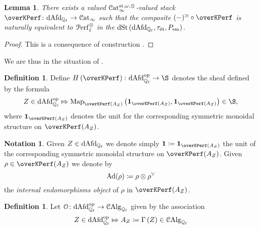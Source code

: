 \documentclass[10pt,a4paper]{amsart}
\numberwithin{equation}{subsection}
\theoremstyle{plain}
\newtheorem{lemma}[theorem]{Lemma}
\theoremstyle{definition}
\newtheorem{defi}[theorem]{Definition}
\newtheorem{notation}[theorem]{Notation}
\theoremstyle{remark}
\numberwithin{equation}{section}
\begin{document}
\begin{lemma} \label{lem:rigidity}
There exists a valued $\mathcal{C}\mathrm{at}_\infty^{\mathrm{st}, \omega, \otimes}$-valued stack $\overKPerf \colon \dAfdl \to \Cat$ such that the composite $(-)^{\simeq} \circ \overKPerf$ is naturally equivalent to $\mathcal{P} \mathrm{erf}^{\otimes}_{\ell}$ in the \infcat $\mathrm{dSt} \left( \mathrm{dAfd}_{\mathbb{Q}_\ell}, \tau_{\text{\'et}}, P_{\mathrm{sm}} \right)$.
\end{lemma}

\begin{proof}
This is a consequence of construction \cite{me1}.
\end{proof}

We are thus in the situation of \cite[$\textsection$ 3]{toen_ss}.

\begin{defi}
Define $H \left( \overKPerf \right) \colon \dAfdl^{\op} \to \S$ denotes the sheaf defined by the formula
	\[
		Z \in \dAfdl^{\op} \Mapsto \Map_{\overKPerf(A_Z)} \left(\mathbf 1_{\overKPerf(A_Z)}, \mathbf 1_{\overKPerf(A_Z)} \right) \in \S,
	\]
where $\mathbf 1_{\overKPerf(A_Z)}$ denotes the unit for the corresponding symmetric monoidal structure on $\overKPerf(A_Z)$.
\end{defi}

\begin{notation}
Given $Z \in \mathrm{dAfd}_{\mathbb{Q}_\ell}$ we denote simply $\mathbf 1 \coloneqq \mathbf 1_{\overKPerf(A_Z)}$ the unit of the corresponding symmetric monoidal structure on $\overKPerf(A_Z)$. Given $\rho \in \overKPerf(A_Z)$ we denote by 
	\[
		\mathrm{Ad}(\rho) \coloneqq \rho \otimes \rho^\vee
	\]
the \emph{internal endomorphisms object} of $\rho $ in $\overKPerf(A_Z)$.
\end{notation}

\begin{defi}
Let $\mathcal{O} \colon \mathrm{dAfd}_{\mathbb{Q}_\ell}^{\mathrm{op}} \to \mathcal{C}\mathrm{Alg}_{\mathbb{Q}_\ell}$ given by the association
	\[
		Z \in \mathrm{dAfd}_{\mathbb{Q}_\ell}^{\mathrm{op}} \Mapsto A_Z \coloneqq \Gamma \left( Z \right) \in \mathcal{C}\mathrm{Alg}_{\mathbb{Q}_\ell}
	\]
\end{defi}
\end{document}
